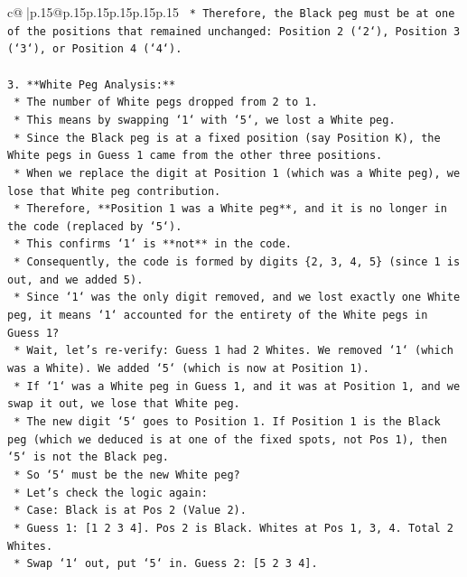 \documentclass{article}
\begin{document}
{\begin{supertabular}{c@{$\;$}|p{.15\linewidth}@{}p{.15\linewidth}p{.15\linewidth}p{.15\linewidth}p{.15\linewidth}p{.15\linewidth}}
{{{\texttt{    *   Therefore, the Black peg must be at one of the positions that remained unchanged: Position 2 (`2`), Position 3 (`3`), or Position 4 (`4`).} \\
\\ 
\texttt{3.  **White Peg Analysis:**} \\
\texttt{    *   The number of White pegs dropped from 2 to 1.} \\
\texttt{    *   This means by swapping `1` with `5`, we lost a White peg.} \\
\texttt{    *   Since the Black peg is at a fixed position (say Position K), the White pegs in Guess 1 came from the other three positions.} \\
\texttt{    *   When we replace the digit at Position 1 (which was a White peg), we lose that White peg contribution.} \\
\texttt{    *   Therefore, **Position 1 was a White peg**, and it is no longer in the code (replaced by `5`).} \\
\texttt{    *   This confirms `1` is **not** in the code.} \\
\texttt{    *   Consequently, the code is formed by digits \{2, 3, 4, 5\} (since 1 is out, and we added 5).} \\
\texttt{    *   Since `1` was the only digit removed, and we lost exactly one White peg, it means `1` accounted for the entirety of the White pegs in Guess 1?} \\
\texttt{        *   Wait, let's re{-}verify: Guess 1 had 2 Whites. We removed `1` (which was a White). We added `5` (which is now at Position 1).} \\
\texttt{        *   If `1` was a White peg in Guess 1, and it was at Position 1, and we swap it out, we lose that White peg.} \\
\texttt{        *   The new digit `5` goes to Position 1. If Position 1 is the Black peg (which we deduced is at one of the fixed spots, not Pos 1), then `5` is not the Black peg.} \\
\texttt{        *   So `5` must be the new White peg?} \\
\texttt{        *   Let's check the logic again:} \\
\texttt{            *   Case: Black is at Pos 2 (Value 2).} \\
\texttt{            *   Guess 1: {[}1 2 3 4{]}. Pos 2 is Black. Whites at Pos 1, 3, 4. Total 2 Whites.} \\
\texttt{            *   Swap `1` out, put `5` in. Guess 2: {[}5 2 3 4{]}.} \\
}}}
\end{supertabular}}
\end{document}
